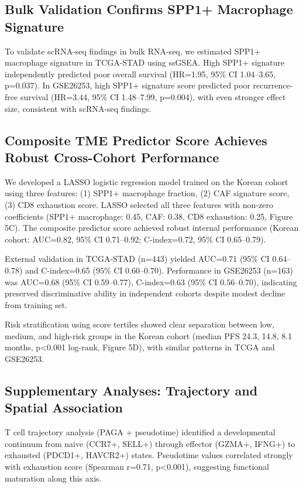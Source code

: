 \documentclass[12pt,twoside]{article}
\begin{document}
\subsection{Bulk Validation Confirms SPP1+ Macrophage Signature}

To validate scRNA-seq findings in bulk RNA-seq, we estimated SPP1+ macrophage signature in TCGA-STAD using ssGSEA. High SPP1+ signature independently predicted poor overall survival (HR=1.95, 95\% CI 1.04--3.65, p=0.037). In GSE26253, high SPP1+ signature score predicted poor recurrence-free survival (HR=3.44, 95\% CI 1.48--7.99, p=0.004), with even stronger effect size, consistent with scRNA-seq findings.

\subsection{Composite TME Predictor Score Achieves Robust Cross-Cohort Performance}

We developed a LASSO logistic regression model trained on the Korean cohort using three features: (1) SPP1+ macrophage fraction, (2) CAF signature score, (3) CD8 exhaustion score. LASSO selected all three features with non-zero coefficients (SPP1+ macrophage: 0.45, CAF: 0.38, CD8 exhaustion: 0.25, Figure 5C). The composite predictor score achieved robust internal performance (Korean cohort: AUC=0.82, 95\% CI 0.71--0.92; C-index=0.72, 95\% CI 0.65--0.79).

External validation in TCGA-STAD (n=443) yielded AUC=0.71 (95\% CI 0.64--0.78) and C-index=0.65 (95\% CI 0.60--0.70). Performance in GSE26253 (n=163) was AUC=0.68 (95\% CI 0.59--0.77), C-index=0.63 (95\% CI 0.56--0.70), indicating preserved discriminative ability in independent cohorts despite modest decline from training set.

Risk stratification using score tertiles showed clear separation between low, medium, and high-risk groups in the Korean cohort (median PFS 24.3, 14.8, 8.1 months, p<0.001 log-rank, Figure 5D), with similar patterns in TCGA and GSE26253.

\subsection{Supplementary Analyses: Trajectory and Spatial Association}

T cell trajectory analysis (PAGA + pseudotime) identified a developmental continuum from naive (CCR7+, SELL+) through effector (GZMA+, IFNG+) to exhausted (PDCD1+, HAVCR2+) states. Pseudotime values correlated strongly with exhaustion score (Spearman r=0.71, p<0.001), suggesting functional maturation along this axis.
\end{document}

